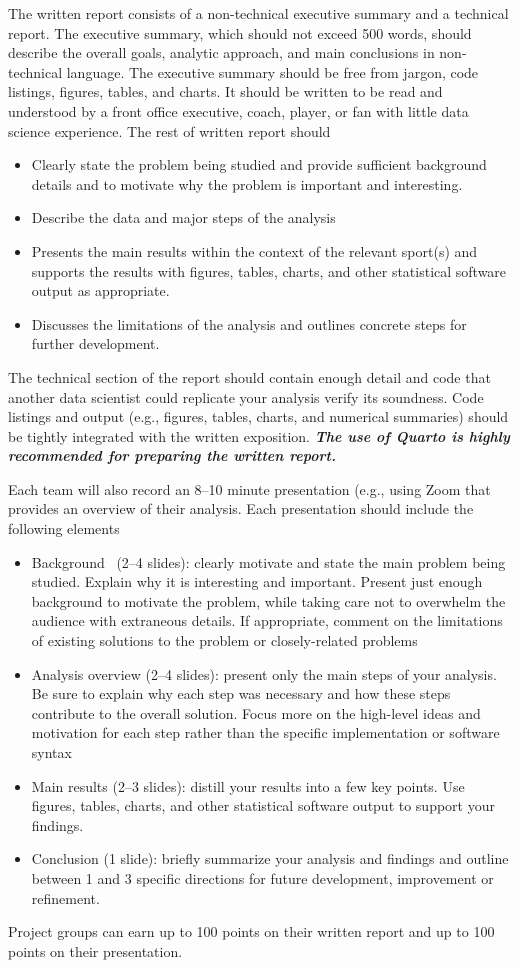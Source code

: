 \documentclass[11pt]{article}
\begin{document}
The written report consists of a non-technical executive summary and a technical report.
The executive summary, which should not exceed 500 words, should describe the overall goals, analytic approach, and main conclusions in non-technical language.
The executive summary should be free from jargon, code listings, figures, tables, and charts.
It should be written to be read and understood by a front office executive, coach, player, or fan with little data science experience.
The rest of written report should 
\begin{itemize}
\item{Clearly state the problem being studied and provide sufficient background details and to motivate why the problem is important and interesting.}
\item{Describe the data and major steps of the analysis}
\item{Presents the main results within the context of the relevant sport(s) and supports the results with figures, tables, charts, and other statistical software output as appropriate.}
\item{Discusses the limitations of the analysis and outlines concrete steps for further development.}
\end{itemize}
The technical section of the report should contain enough detail and code that another data scientist could replicate your analysis verify its soundness.
Code listings and output (e.g., figures, tables, charts, and numerical summaries) should be tightly integrated with the written exposition.
\emph{\textbf{The use of Quarto is highly recommended for preparing the written report.}}

Each team will also record an 8--10 minute presentation (e.g., using Zoom that provides an overview of their analysis.
Each presentation should include the following elements
\begin{itemize}
\item{Background  (2--4 slides): clearly motivate and state the main problem being studied. Explain why it is interesting and important. Present just enough background to motivate the problem, while taking care not to overwhelm the audience with extraneous details. If appropriate, comment on the limitations of existing solutions to the problem or closely-related problems}
\item{Analysis overview (2--4 slides): present only the main steps of your analysis. Be sure to explain why each step was necessary and how these steps contribute to the overall solution. Focus more on the high-level ideas and motivation for each step rather than the specific implementation or software syntax}
\item{Main results (2--3 slides): distill your results into a few key points. Use figures, tables, charts, and other statistical software output to support your findings.}
\item{Conclusion (1 slide): briefly summarize your analysis and findings and outline between 1 and 3 specific directions for future development, improvement or refinement.}
\end{itemize}
Project groups can earn up to 100 points on their written report and up to 100 points on their presentation.
\end{document}
